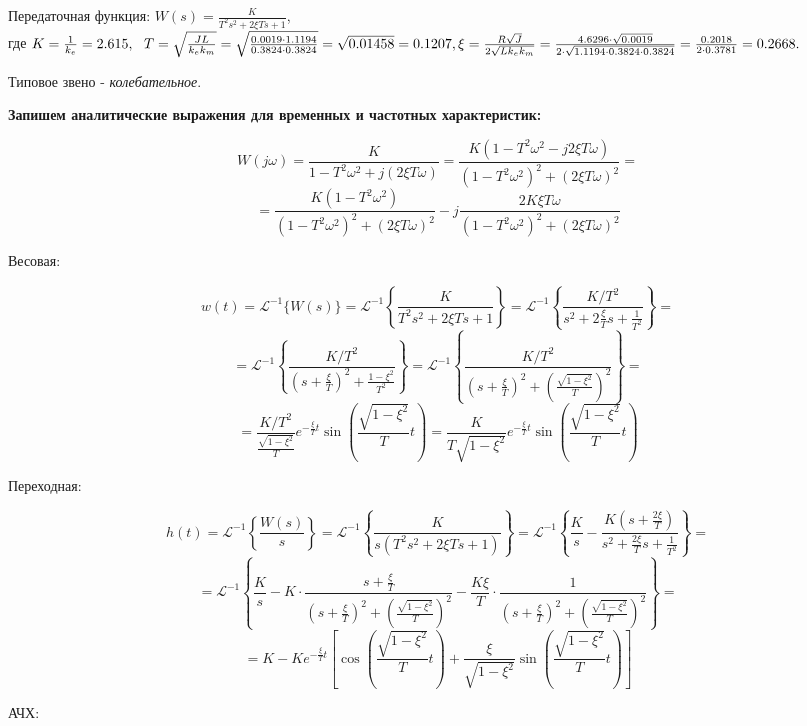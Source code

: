 Передаточная функция: $W(s)=\frac{K}{T^2 s^2 +2\xi Ts+1}$,\\
где $
K=\frac{1}{k_e }=2.615,~~T=\sqrt{\frac{JL}{k_e k_m }}=\sqrt{\frac{0.0019\cdot 1.1194}{0.3824\cdot 0.3824}}=\sqrt{0.01458}=0.1207,\\
\xi =\frac{R\sqrt{J}}{2\sqrt{Lk_e k_m }}=\frac{4.6296\cdot \sqrt{0.0019}}{2\cdot \sqrt{1.1194\cdot 0.3824\cdot 0.3824}}=\frac{0.2018}{2\cdot 0.3781}=0.2668.
$

Типовое звено - \textit{колебательное}.

\textbf{Запишем аналитические выражения для временных и частотных характеристик:}

$$W(j\omega )=\frac{K}{1-T^2 \omega^2 +j(2\xi T\omega )}=\frac{K(1-T^2 \omega^2 -j2\xi T\omega )}{(1-T^2 \omega^2 )^2 +(2\xi T\omega )^2 }=
$$
$$=\frac{K(1-T^2 \omega^2 )}{(1-T^2 \omega^2 )^2 +(2\xi T\omega )^2 }-j\frac{2K\xi T\omega }{(1-T^2 \omega^2 )^2 +(2\xi T\omega )^2 }$$

Весовая:

 $$
w(t)={\mathcal{L}}^{-1} \lbrace W(s)\rbrace ={\mathcal{L}}^{-1} \left\lbrace \frac{K}{T^2 s^2 +2\xi Ts+1}\right\rbrace ={\mathcal{L}}^{-1} \left\lbrace \frac{K/T^2 }{s^2 +2\frac{\xi }{T}s+\frac{1}{T^2 }}\right\rbrace =$$$$
={\mathcal{L}}^{-1} \left\lbrace \frac{K/T^2 }{{\left(s+\frac{\xi }{T}\right)}^2 +\frac{1-\xi^2 }{T^2 }}\right\rbrace ={\mathcal{L}}^{-1} \left\lbrace \frac{K/T^2 }{{\left(s+\frac{\xi }{T}\right)}^2 +{\left(\frac{\sqrt{1-\xi^2 }}{T}\right)}^2 }\right\rbrace =$$$$
=\frac{K/T^2 }{\frac{\sqrt{1-\xi^2 }}{T}}e^{-\frac{\xi }{T}t} \sin \left(\frac{\sqrt{1-\xi^2 }}{T}t\right)=\frac{K}{T\sqrt{1-\xi^2 }}e^{-\frac{\xi }{T}t} \sin \left(\frac{\sqrt{1-\xi^2 }}{T}t\right)
$$

Переходная:

 $$
h(t)={\mathcal{L}}^{-1} \left\lbrace \frac{W(s)}{s}\right\rbrace ={\mathcal{L}}^{-1} \left\lbrace \frac{K}{s(T^2 s^2 +2\xi Ts+1)}\right\rbrace ={\mathcal{L}}^{-1} \left\lbrace \frac{K}{s}-\frac{K(s+\frac{2\xi }{T})}{s^2 +\frac{2\xi }{T}s+\frac{1}{T^2 }}\right\rbrace =$$$$
={\mathcal{L}}^{-1} \left\lbrace \frac{K}{s}-K\cdot \frac{s+\frac{\xi }{T}}{(s+\frac{\xi }{T})^2 +{\left(\frac{\sqrt{1-\xi^2 }}{T}\right)}^2 }-\frac{K\xi }{T}\cdot \frac{1}{(s+\frac{\xi }{T})^2 +{\left(\frac{\sqrt{1-\xi^2 }}{T}\right)}^2 }\right\rbrace =$$$$
=K-Ke^{-\frac{\xi }{T}t} \left\lbrack \cos \left(\frac{\sqrt{1-\xi^2 }}{T}t\right)+\frac{\xi }{\sqrt{1-\xi^2 }}\sin \left(\frac{\sqrt{1-\xi^2 }}{T}t\right)\right\rbrack 
$$

АЧХ: 

